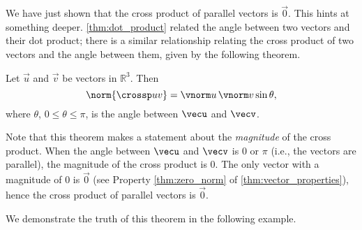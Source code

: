 We have just shown that the cross product of parallel vectors is $\vec 0$. This hints at something deeper. \autoref{thm:dot_product} related the angle between two vectors and their dot product; there is a similar relationship relating the cross product of two vectors and the angle between them, given by the following theorem.

\begin{theorem}\label{thm:cross_product}
Let $\vec u$ and $\vec v$ be vectors in $\mathbb{R}^3$. Then
\[\norm{\crossp uv} = \vnorm u\, \vnorm v \sin\theta,\]
where $\theta$, $0\leq \theta \leq \pi$, is the angle between $\vecu$ and $\vecv$.
\end{theorem}


Note that this theorem makes a statement about the \emph{magnitude} of the cross product. When the angle between $\vecu$ and $\vecv$ is 0 or $\pi$ (i.e., the vectors are parallel), the magnitude of the cross product is 0. The only vector with a magnitude of 0 is $\vec 0$ (see Property \ref{thm:zero_norm} of \autoref{thm:vector_properties}), hence the cross product of  parallel vectors is $\vec 0$.\bigskip

We demonstrate the truth of this theorem in the following example.

